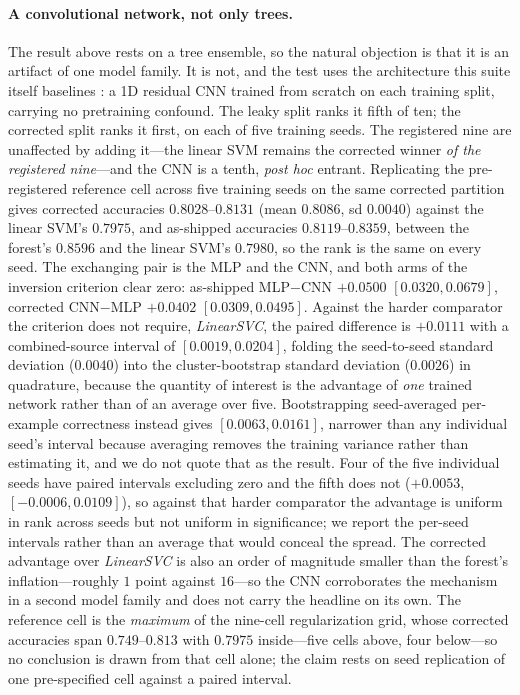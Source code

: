 \documentclass[webpdf,modern,large,namedate]{oup-authoring-template}%
\begin{document}
\paragraph{A convolutional network, not only trees.} The result above rests on a tree ensemble, so the natural objection is that it is an artifact of one model family. It is not, and the test uses the architecture this suite itself baselines \citep{gresova2023}: a 1D residual CNN trained from scratch on each training split, carrying no pretraining confound. The leaky split ranks it fifth of ten; the corrected split ranks it first, on each of five training seeds. The registered nine are unaffected by adding it---the linear SVM remains the corrected winner \emph{of the registered nine}---and the CNN is a tenth, \emph{post hoc} entrant. Replicating the pre-registered reference cell across five training seeds on the same corrected partition gives corrected accuracies $0.8028$--$0.8131$ (mean $0.8086$, sd $0.0040$) against the linear SVM's $0.7975$, and as-shipped accuracies $0.8119$--$0.8359$, between the forest's $0.8596$ and the linear SVM's $0.7980$, so the rank is the same on every seed. The exchanging pair is the MLP and the CNN, and both arms of the inversion criterion clear zero: as-shipped MLP$-$CNN $+0.0500$ $[0.0320,0.0679]$, corrected CNN$-$MLP $+0.0402$ $[0.0309,0.0495]$. Against the harder comparator the criterion does not require, \textit{LinearSVC}, the paired difference is $+0.0111$ with a combined-source interval of $[0.0019,0.0204]$, folding the seed-to-seed standard deviation ($0.0040$) into the cluster-bootstrap standard deviation ($0.0026$) in quadrature, because the quantity of interest is the advantage of \emph{one} trained network rather than of an average over five. Bootstrapping seed-averaged per-example correctness instead gives $[0.0063,0.0161]$, narrower than any individual seed's interval because averaging removes the training variance rather than estimating it, and we do not quote that as the result. Four of the five individual seeds have paired intervals excluding zero and the fifth does not ($+0.0053$, $[-0.0006,0.0109]$), so against that harder comparator the advantage is uniform in rank across seeds but not uniform in significance; we report the per-seed intervals rather than an average that would conceal the spread. The corrected advantage over \textit{LinearSVC} is also an order of magnitude smaller than the forest's inflation---roughly $1$ point against $16$---so the CNN corroborates the mechanism in a second model family and does not carry the headline on its own. The reference cell is the \emph{maximum} of the nine-cell regularization grid, whose corrected accuracies span $0.749$--$0.813$ with $0.7975$ inside---five cells above, four below---so no conclusion is drawn from that cell alone; the claim rests on seed replication of one pre-specified cell against a paired interval.
\end{document}
